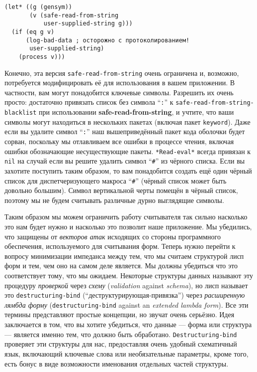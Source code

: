 \begin{verbatim}
(let* ((g (gensym))
       (v (safe-read-from-string
           user-supplied-string g)))
  (if (eq g v)
      (log-bad-data ; осторожно с протоколированием!
       user-supplied-string)
    (process v)))
\end{verbatim}

Конечно, эта версия \verb"safe-read-from-string" очень ограничена и, возможно, потребуется модифицировать её для использования в вашем приложении. В частности, вам могут понадобится ключевые символы. Разрешить их очень просто: достаточно привязать список без символа ``\verb":"'' к \verb"safe-read-from-string-blacklist" при использовании \textbf{sa\-fe-re\-ad-fro\-m-stri\-ng}, и учтите, что ваши символы могут находиться в нескольких пакетах (включая пакет \verb"keyword"). Даже если вы удалите символ ``\verb":"'' наш вышеприведённый пакет кода оболочки будет сорван, поскольку мы отлавливаем все ошибки в процессе чтения, включая ошибки обозначающие несуществующие пакеты. \verb"*Read-eval*" всегда привязан к \verb"nil" на случай если вы решите удалить символ ``\verb"#"'' из чёрного списка. Если вы захотите поступить таким образом, то вам понадобится создать ещё один чёрный список для диспетчеризующего макроса ``\verb"#"'' (чёрный список может быть довольно большим). Символ вертикальной черты помещён в чёрный список, поэтому мы не будем считывать различные дурно выглядящие символы.

Таким образом мы можем ограничить работу считывателя так сильно насколько это нам будет нужно и насколько это позволит наше приложение. Мы убедились, что защищены от \emph{векторов атак} исходящих со стороны программного обеспечения, используемого для считывания форм. Теперь нужно перейти к вопросу минимизации импеданса между тем, что мы считаем структурой лисп форм и тем, чем оно на самом деле является. Мы должны убедиться что это соответствует тому, что мы ожидаем. Некоторые структуры данных называют эту процедуру \emph{проверкой} через \emph{схему} (\emph{validation} against \emph{schema}), но лисп называет это \verb"destructuring-bind" (``деструктурирующая-привязка'') через \emph{расширенную лямбда форму} (\verb"destructuring-bind" against an \emph{extended lambda form}). Все эти термины представляют простые концепции, но звучат очень серьёзно. Идея заключается в том, что вы хотите убедиться, что данные --- форма или структура --- является именно тем, что должно быть обработано. \verb"Destructuring-bind" проверяет эти структуры для нас, предоставляя очень удобный схематичный язык, включающий ключевые слова или необязательные параметры, кроме того, есть бонус в виде возможности именования отдельных частей структуры.


